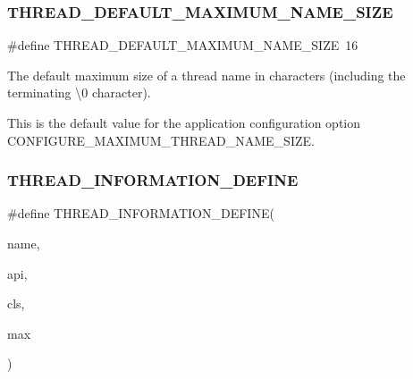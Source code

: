 \subsubsection{\texorpdfstring{THREAD\_DEFAULT\_MAXIMUM\_NAME\_SIZE}{THREAD\_DEFAULT\_MAXIMUM\_NAME\_SIZE}}
{\footnotesize\ttfamily \#define T\+H\+R\+E\+A\+D\+\_\+\+D\+E\+F\+A\+U\+L\+T\+\_\+\+M\+A\+X\+I\+M\+U\+M\+\_\+\+N\+A\+M\+E\+\_\+\+S\+I\+ZE~16}



The default maximum size of a thread name in characters (including the terminating \textquotesingle{}\textbackslash{}0\textquotesingle{} character). 

This is the default value for the application configuration option C\+O\+N\+F\+I\+G\+U\+R\+E\+\_\+\+M\+A\+X\+I\+M\+U\+M\+\_\+\+T\+H\+R\+E\+A\+D\+\_\+\+N\+A\+M\+E\+\_\+\+S\+I\+ZE. \mbox{\label{group__RTEMSScoreThread_ga57b827079acdd2597db9cbb6f69d12b4}} 
\subsubsection{\texorpdfstring{THREAD\_INFORMATION\_DEFINE}{THREAD\_INFORMATION\_DEFINE}}
{\footnotesize\ttfamily \#define T\+H\+R\+E\+A\+D\+\_\+\+I\+N\+F\+O\+R\+M\+A\+T\+I\+O\+N\+\_\+\+D\+E\+F\+I\+NE(\begin{DoxyParamCaption}\item[{}]{name,  }\item[{}]{api,  }\item[{}]{cls,  }\item[{}]{max }\end{DoxyParamCaption})}

